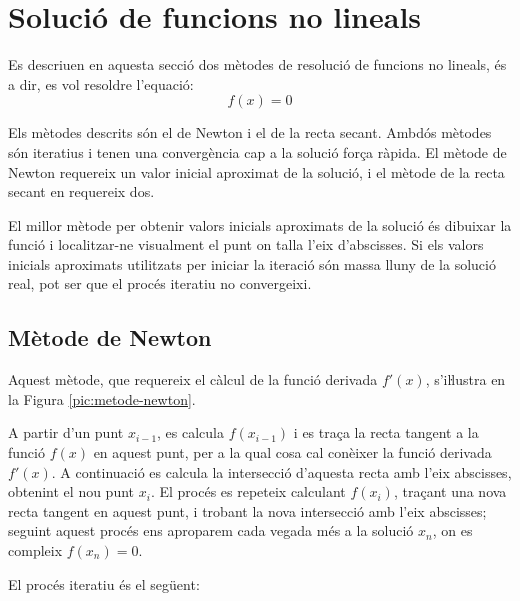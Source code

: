 \section{Solució de funcions no lineals}\label{sec:func-no-lin}

Es descriuen en aquesta secció dos mètodes de resolució de funcions no lineals, és a dir, es vol resoldre l'equació: \begin{equation}
   f(x) = 0 \end{equation}

Els mètodes descrits són el de Newton i el de la recta secant. Ambdós mètodes són iteratius i tenen una convergència cap a la solució força ràpida. El mètode de Newton requereix un valor inicial aproximat de la solució, i el mètode de la recta secant en requereix dos.

El millor mètode per obtenir valors inicials aproximats de la solució és dibuixar la funció i localitzar-ne visualment el punt on talla l'eix d'abscisses. Si els valors inicials aproximats utilitzats per iniciar la iteració són massa lluny de la solució real, pot ser que el procés iteratiu no convergeixi.


\subsection{Mètode de Newton}

Aquest mètode, que requereix el càlcul de la funció derivada $f'(x)$, s'iŀlustra en la Figura \vref{pic:metode-newton}.

\begin{center}
    
    \label{pic:metode-newton}
\end{center}


A partir d'un punt $x_{i-1}$, es calcula $f(x_{i-1})$ i es traça la recta tangent a la funció $f(x)$ en aquest punt, per a la qual cosa cal conèixer la funció derivada $f'(x)$. A continuació es calcula la intersecció d'aquesta recta amb l'eix abscisses, obtenint el nou punt $x_i$. El procés es repeteix calculant $f(x_i)$, traçant una nova recta tangent en aquest punt, i trobant la nova intersecció amb l'eix abscisses; seguint aquest procés ens aproparem cada vegada més a la solució $x_n$, on es compleix $f(x_n)=0$.


El procés iteratiu és el següent:

